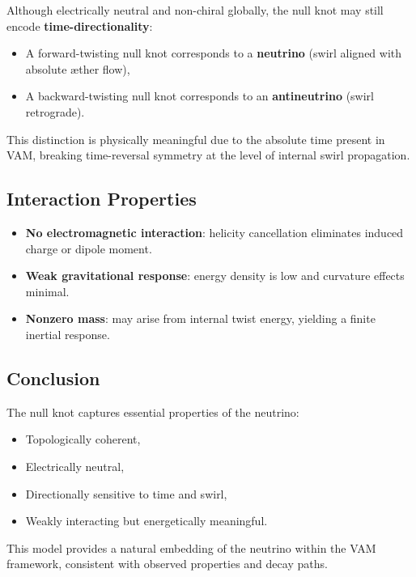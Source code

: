 Although electrically neutral and non-chiral globally, the null knot may still encode \textbf{time-directionality}:

\begin{itemize}
    \item A forward-twisting null knot corresponds to a \textbf{neutrino} (swirl aligned with absolute æther flow),
    \item A backward-twisting null knot corresponds to an \textbf{antineutrino} (swirl retrograde).
\end{itemize}

This distinction is physically meaningful due to the absolute time present in VAM, breaking time-reversal symmetry at the level of internal swirl propagation.

\subsection{Interaction Properties}

\begin{itemize}
    \item \textbf{No electromagnetic interaction}: helicity cancellation eliminates induced charge or dipole moment.
    \item \textbf{Weak gravitational response}: energy density is low and curvature effects minimal.
    \item \textbf{Nonzero mass}: may arise from internal twist energy, yielding a finite inertial response.
\end{itemize}

\subsection{Conclusion}

The null knot captures essential properties of the neutrino:
\begin{itemize}
    \item Topologically coherent,
    \item Electrically neutral,
    \item Directionally sensitive to time and swirl,
    \item Weakly interacting but energetically meaningful.
\end{itemize}

This model provides a natural embedding of the neutrino within the VAM framework, consistent with observed properties and decay paths.
